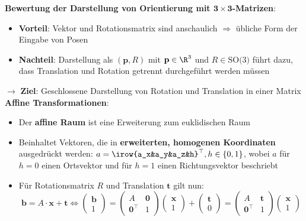\bigskip
\textbf{Bewertung der Darstellung von Orientierung mit $\mathbf{3\times3}$-Matrizen}:
\begin{itemize}
	\item \textbf{Vorteil}: Vektor und Rotationsmatrix sind anschaulich $\Rightarrow$ übliche Form der Eingabe von Posen
	\item \textbf{Nachteil}: Darstellung als $(\mathbf{p},R)$ mit $\mathbf{p}\in\R^3$ und $R\in\text{SO(3)}$ führt dazu, dass Translation und Rotation getrennt durchgeführt werden müssen 
\end{itemize}

$\rightarrow$ \textbf{Ziel}: Geschlossene Darstellung von Rotation und Translation in einer Matrix\\

\textbf{Affine Transformationen}:
\begin{itemize}
	\item Der \textbf{affine Raum} ist eine Erweiterung zum euklidischen Raum
	\item Beinhaltet Vektoren, die in \textbf{erweiterten, homogenen Koordinaten} ausgedrückt werden: $a=\irow{a_x&a_y&a_z&h}^\top, h\in\{0,1\}$, wobei $a$ für $h=0$ einen Ortsvektor und für $h=1$ einen Richtungsvektor beschriebt
	\item Für Rotationsmatrix $R$ und Translation $\mathbf{t}$ gilt nun: 
	$$\mathbf{b}=A\cdot\mathbf{x}+\mathbf{t}
	\Leftrightarrow 
	\left(\begin{matrix}
		\mathbf{b} \\
		1
	\end{matrix}\right)=
	\left(\begin{matrix}
		A & \mathbf{0} \\
		\mathbf{0}^\top & 1
	\end{matrix}\right)
	\left(\begin{matrix}
		\mathbf{x} \\
		1
	\end{matrix}\right)+
	\left(\begin{matrix}
		\mathbf{t} \\
		0
	\end{matrix}\right)=
	\left(\begin{matrix}
		A & \mathbf{t} \\
		\mathbf{0}^\top & 1
	\end{matrix}\right)
	\left(\begin{matrix}
		\mathbf{x} \\
		1
	\end{matrix}\right)
	$$

\end{itemize}
